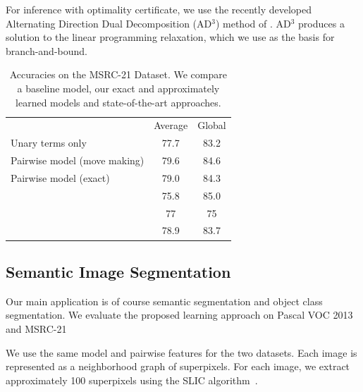For inference with optimality certificate, we use the recently developed
Alternating Direction Dual Decomposition (AD$^3$) method of
\citet{martins2011augmented}. AD$^3$ produces a solution to the linear
programming relaxation, which we use as the basis for branch-and-bound.

\begin{table}
    \begin{center}
    \begin{tabularx}{\linewidth}{@{\extracolsep{\fill}}lcc}
        \toprule
                    & Average & Global \\
        \cmidrule{1-3}
    Unary terms only & 77.7& 83.2 \\
    Pairwise model (move making)& 79.6&84.6\\
    Pairwise model (exact)& 79.0 & 84.3\\
        \cmidrule{1-3}
    \citet{ladicky2009associative} & 75.8& 85.0\\
    \citet{gonfaus2010harmony} & 77&  75\\
    \citet{lucchi2013learning} & 78.9& 83.7\\
    \bottomrule
    \end{tabularx}
    \end{center}
    \caption{Accuracies on the MSRC-21 Dataset.  We compare a baseline model,
    our exact and approximately learned models and state-of-the-art
    approaches.}
    
\end{table}




\subsection{Semantic Image Segmentation}
Our main application is of course semantic segmentation and object class
segmentation. We evaluate the proposed learning approach on Pascal VOC 2013 and
MSRC-21

We use the same model and pairwise features for the two datasets.
Each image is represented as a neighborhood graph of superpixels.
For each image, we extract approximately 100 superpixels using 
the SLIC algorithm~\citep{achanta2012slic}.

